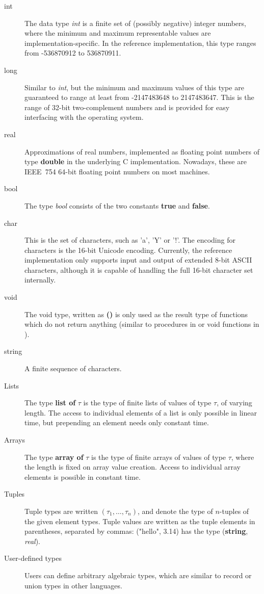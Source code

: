 \begin{description}
  
\item[int] The data type {\em int} is a finite set of (possibly
  negative) integer numbers, where the minimum and maximum
  representable values are implementation-specific.  In the reference
  implementation, this type ranges from -536870912 to 536870911.

\item[long] Similar to {\em int}, but the minimum and maximum values
  of this type are guaranteed to range at least from -2147483648 to
  2147483647.  This is the range of 32-bit two-complement numbers and
  is provided for easy interfacing with the operating system.
  
\item[real] Approximations of real numbers, implemented as floating
  point numbers of type {\bf double} in the underlying C
  implementation.  Nowadays, these are IEEE~754 64-bit floating point
  numbers on most machines.
  
\item[bool] The type {\em bool} consists of the two constants {\bf
    true} and {\bf false}.
  
\item[char] This is the set of characters, such as 'a', 'Y' or '!'.
  The encoding for characters is the 16-bit Unicode encoding.
  Currently, the reference implementation only supports input and
  output of extended 8-bit ASCII characters, although it is capable of
  handling the full 16-bit character set internally.
  
\item[void] The void type, written as {\bf ()} is only used as the
  result type of functions which do not return anything (similar to
  procedures in \modula{} or void functions in \cee{}).

\item[string] A finite sequence of characters.
  
\item[Lists] The type {\bf list of} $\tau$ is the type of finite lists
  of values of type $\tau$, of varying length.  The access to
  individual elements of a list is only possible in linear time, but
  prepending an element needs only constant time.
  
\item[Arrays] The type {\bf array of} $\tau$ is the type of finite
  arrays of values of type $\tau$, where the length is fixed on array
  value creation.  Access to individual array elements is possible in
  constant time.
  
\item[Tuples] Tuple types are written $(\tau_1, \dots, \tau_n)$, and
  denote the type of $n$-tuples of the given element types.  Tuple
  values are written as the tuple elements in parentheses, separated
  by commas: ("hello", 3.14) has the type ({\bf string}, {\em real}).
  
\item[User-defined types] Users can define arbitrary algebraic types,
  which are similar to record or union types in other languages.

\end{description}


